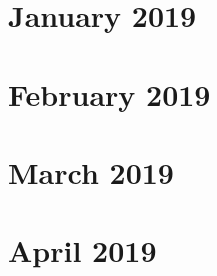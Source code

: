\chapter{January 2019}












\chapter{February 2019}





\chapter{March 2019}



\chapter{April 2019}


